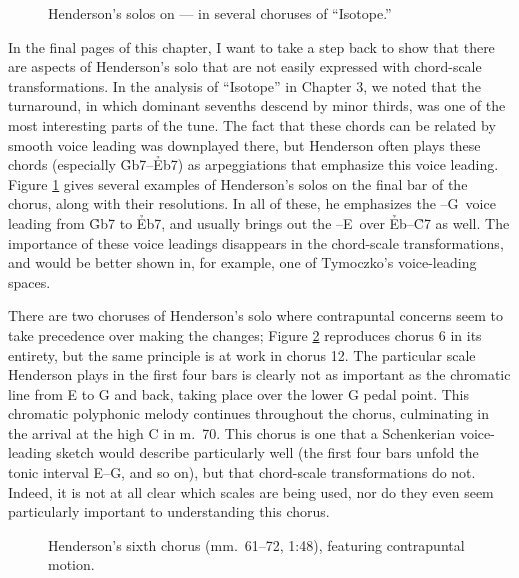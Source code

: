 \begin{figure}[tbp]
  \caption[Henderson's solos on
    \protect\h{Gb7}--\protect\h{Eb7}--\protect\h{C7} in several choruses of
    ``Isotope.'']{Henderson's solos on
    \protect{}--\protect{}--\protect{} in several
    choruses of ``Isotope.''}
  \label{csa:henderson-turnarounds}
\end{figure}

In the final pages of this chapter, I want to take a step back to show that
there are aspects of Henderson's solo that are not easily expressed with
chord-scale transformations. In the analysis of ``Isotope'' in Chapter 3, we
noted that the turnaround, in which dominant sevenths descend by minor thirds,
was one of the most interesting parts of the tune. The fact that these chords
can be related by smooth voice leading was downplayed there, but Henderson
often plays these chords (especially \h{Gb7}--\h{Eb7}) as arpeggiations that
emphasize this voice leading. Figure \ref{csa:henderson-turnarounds} gives
several examples of Henderson's solos on the final bar of the chorus, along
with their resolutions. In all of these, he emphasizes the \Gflat--G\nat\ voice
leading from \h{Gb7} to \h{Eb7}, and usually brings out the \Eflat--E\nat\ over
\h{Eb}--\h{C7} as well. The importance of these voice leadings disappears in
the chord-scale transformations, and would be better shown in, for example, one of
Tymoczko's voice-leading spaces.

There are two choruses of Henderson's solo where contrapuntal concerns seem to
take precedence over making the changes; Figure \ref{csa:contrapuntal-chorus}
reproduces chorus 6 in its entirety, but the same principle is at work in
chorus 12. The particular scale Henderson plays in the first four bars is
clearly not as important as the chromatic line from E to G and back, taking
place over the lower G pedal point. This chromatic polyphonic
melody continues throughout the chorus, culminating in the arrival at the high
C in m.~70. This chorus is one that a Schenkerian voice-leading sketch would
describe particularly well (the first four bars unfold the tonic interval
E--G, and so on), but that chord-scale transformations do not.
Indeed, it is not at all clear which scales are being used, nor do they even
seem particularly important to understanding this chorus.

\begin{figure}[tbp]
  \caption[Henderson's sixth chorus, featuring contrapuntal motion.]{%
    Henderson's sixth chorus (mm.~61--72, 1:48), featuring contrapuntal
    motion.}
  \label{csa:contrapuntal-chorus}
\end{figure}

